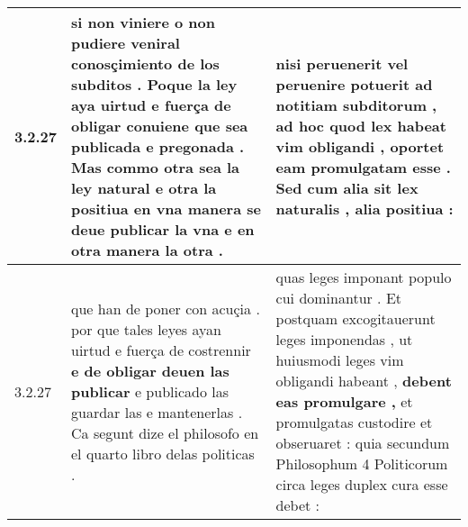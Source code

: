 \begin{tabular}{|p{1cm}|p{6.5cm}|p{6.5cm}|}
3.2.27 & si non viniere o non pudiere veniral conosçimiento de los subditos . \textbf{ Poque la ley aya uirtud e fuerça de obligar } conuiene que sea publicada e pregonada . Mas commo otra sea la ley natural e otra la positiua en vna manera se deue publicar la vna e en otra manera la otra . & nisi peruenerit vel peruenire potuerit ad notitiam subditorum , \textbf{ ad hoc quod lex habeat vim obligandi , } oportet eam promulgatam esse . Sed cum alia sit lex naturalis , alia positiua : \\\hline
3.2.27 & que han de poner con acuçia . por que tales leyes ayan uirtud e fuerça de costrennir \textbf{ e de obligar deuen las publicar } e publicado las guardar las e mantenerlas . Ca segunt dize el philosofo en el quarto libro delas politicas . & quas leges imponant populo cui dominantur . Et postquam excogitauerunt leges imponendas , ut huiusmodi leges vim obligandi habeant , \textbf{ debent eas promulgare , } et promulgatas custodire et obseruaret : quia secundum Philosophum 4 Politicorum circa leges duplex cura esse debet : \\\hline

\end{tabular}
